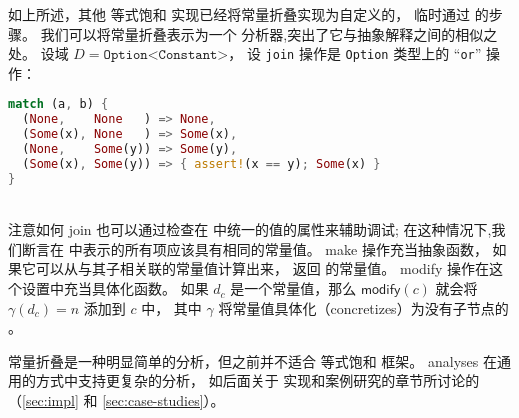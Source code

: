 如上所述，其他 等式饱和 实现已经将常量折叠实现为自定义的，
  临时通过 \egraph 的步骤。 %
我们可以将常量折叠表示为一个 \eclass 分析器,突出了它与抽象解释之间的相似之处。
设域 $D = \texttt{Option<Constant>}$，
  设 \texttt{join} 操作是 \texttt{Option} 类型上的 ``\texttt{or}'' 操作：  
\\
\begin{minipage}{\linewidth}
\begin{lstlisting}[language=Rust, basicstyle=\ttfamily\footnotesize, xleftmargin=35mm]
match (a, b) {
  (None,    None   ) => None,
  (Some(x), None   ) => Some(x),
  (None,    Some(y)) => Some(y),
  (Some(x), Some(y)) => { assert!(x == y); Some(x) }
}
\end{lstlisting}
\end{minipage}
\\
注意如何 \textsf{join} 也可以通过检查在 \egraph 中统一的值的属性来辅助调试;
  在这种情况下,我们断言在 \eclass 中表示的所有项应该具有相同的常量值。
\textsf{make} 操作充当抽象函数，
  如果它可以从与其子\eclasses 相关联的常量值计算出来，
  返回 \enode 的常量值。
\textsf{modify} 操作在这个设置中充当具体化函数。 %
如果 $d_{c}$ 是一个常量值，那么 $\textsf{modify}(c)$ 就会将 
  $\gamma(d_{c}) = n$ 添加到 $c$ 中，
  其中 $\gamma$ 将常量值具体化（concretizes）为没有子节点的 \enode。

常量折叠是一种明显简单的分析，但之前并不适合 等式饱和 框架。
\Eclass analyses 在通用的方式中支持更复杂的分析，
  如后面关于 \egg 实现和案例研究的章节所讨论的
  （\ref{sec:impl} 和 \ref{sec:case-studies}）。

